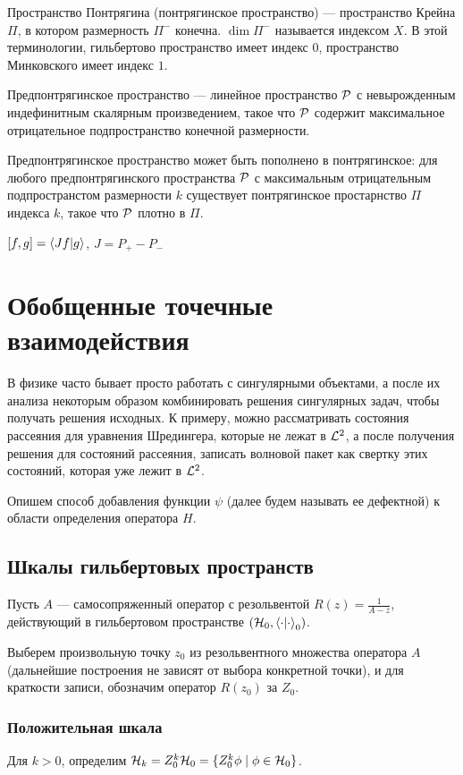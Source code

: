 Пространство Понтрягина (понтрягинское пространство) — пространство Крейна $\Pi$, в котором размерность $\Pi^-$ конечна. $\dim \Pi^-$ называется индексом $X$. В этой терминологии, гильбертово пространство имеет индекс $0$, пространство Минковского имеет индекс $1$.

Предпонтрягинское пространство — линейное пространство $\mathcal{P}$ с невырожденным индефинитным скалярным произведением, такое что $\mathcal{P}$ содержит максимальное отрицательное подпространство конечной размерности. 

Предпонтрягинское пространство может быть пополнено в понтрягинское: для любого предпонтрягинского пространства $\mathcal{P}$ с максимальным отрицательным подпространстом размерности $k$ существует понтрягинское простарнство $\Pi$ индекса $k$, такое что $\mathcal{P}$ плотно в $\Pi$.

$[f, g] = \ip{J f}{g}$, $J = P_+ - P_-$


\section{Обобщенные точечные взаимодействия}
В физике часто бывает просто работать с сингулярными объектами, а после их анализа некоторым образом комбинировать решения сингулярных задач, чтобы получать решения исходных. К примеру, можно рассматривать состояния рассеяния для уравнения Шредингера, которые не лежат в $\mathcal{L}^2$, а после получения решения для состояний рассеяния, записать волновой пакет как свертку этих состояний, которая уже лежит в $\mathcal{L}^2$. 


Опишем способ добавления функции $\psi$ (далее будем называть ее дефектной) к области определения оператора $H$.

\subsection{Шкалы гильбертовых пространств}
Пусть $A$ — самосопряженный оператор с резольвентой $R(z) = \frac{1}{A - z}$, действующий в гильбертовом пространстве $(\hilb{0}, \ipcdot_0)$.

Выберем произвольную точку $z_0$ из резольвентного множества оператора $A$ (дальнейшие построения не зависят от выбора конкретной точки), и для краткости записи, обозначим оператор $R(z_0)$ за $Z_0$.

\subsubsection{Положительная шкала}
Для $k > 0$, определим $\mathcal{H}_{k} = Z_0^k \mathcal{H}_{0} = \{ Z_0^k \phi \mid \phi \in \mathcal{H}_{0} \}$.

